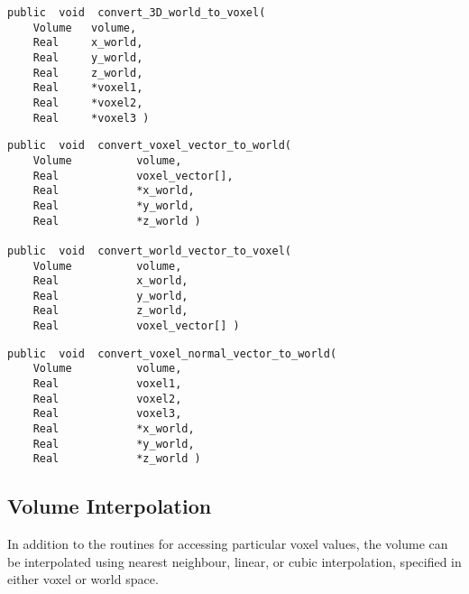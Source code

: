
{\bf\begin{verbatim}
public  void  convert_3D_world_to_voxel(
    Volume   volume,
    Real     x_world,
    Real     y_world,
    Real     z_world,
    Real     *voxel1,
    Real     *voxel2,
    Real     *voxel3 )
\end{verbatim}}


{\bf\begin{verbatim}
public  void  convert_voxel_vector_to_world(
    Volume          volume,
    Real            voxel_vector[],
    Real            *x_world,
    Real            *y_world,
    Real            *z_world )

public  void  convert_world_vector_to_voxel(
    Volume          volume,
    Real            x_world,
    Real            y_world,
    Real            z_world,
    Real            voxel_vector[] )
\end{verbatim}}


{\bf\begin{verbatim}
public  void  convert_voxel_normal_vector_to_world(
    Volume          volume,
    Real            voxel1,
    Real            voxel2,
    Real            voxel3,
    Real            *x_world,
    Real            *y_world,
    Real            *z_world )
\end{verbatim}}


\subsection{Volume Interpolation}

In addition to the routines for accessing particular voxel values, the
volume can be interpolated using nearest neighbour, linear, or cubic
interpolation, specified in either voxel or world space.

